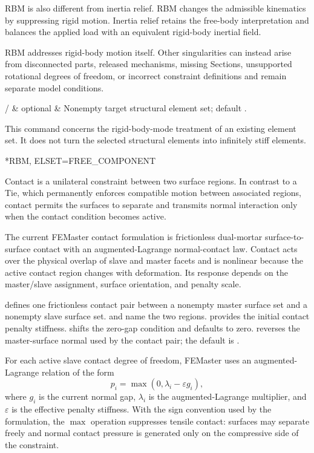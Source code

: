 RBM is also different from inertia relief. RBM changes the admissible kinematics by suppressing rigid motion. Inertia relief retains the free-body interpretation and balances the applied load with an equivalent rigid-body inertial field.

RBM addresses rigid-body motion itself. Other singularities can instead arise from disconnected parts, released mechanisms, missing Sections, unsupported rotational degrees of freedom, or incorrect constraint definitions and remain separate model conditions.

\begin{keywordparameters}
 /  & optional & Nonempty target structural element set; default . \\
\end{keywordparameters}

This command concerns the rigid-body-mode treatment of an existing element set. It does not turn the selected structural elements into infinitely stiff elements.

\exampleheading
\begin{inputdeck}
*RBM, ELSET=FREE_COMPONENT
\end{inputdeck}

\label{sec:contact}

Contact is a unilateral constraint between two surface regions. In contrast to a Tie, which permanently enforces compatible motion between associated regions, contact permits the surfaces to separate and transmits normal interaction only when the contact condition becomes active.

The current FEMaster contact formulation is frictionless dual-mortar surface-to-surface contact with an augmented-Lagrange normal-contact law. Contact acts over the physical overlap of slave and master facets and is nonlinear because the active contact region changes with deformation. Its response depends on the master/slave assignment, surface orientation, and penalty scale.

 defines one frictionless contact pair between a nonempty master surface set and a nonempty slave surface set.  and  name the two regions.  provides the initial contact penalty stiffness.  shifts the zero-gap condition and defaults to zero.  reverses the master-surface normal used by the contact pair; the default is .

For each active slave contact degree of freedom, FEMaster uses an augmented-Lagrange relation of the form
\[
p_i=\max\left(0,\lambda_i-\varepsilon g_i\right),
\]
where \(g_i\) is the current normal gap, \(\lambda_i\) is the augmented-Lagrange multiplier, and \(\varepsilon\) is the effective penalty stiffness. With the sign convention used by the formulation, the \(\max\) operation suppresses tensile contact: surfaces may separate freely and normal contact pressure is generated only on the compressive side of the constraint.

